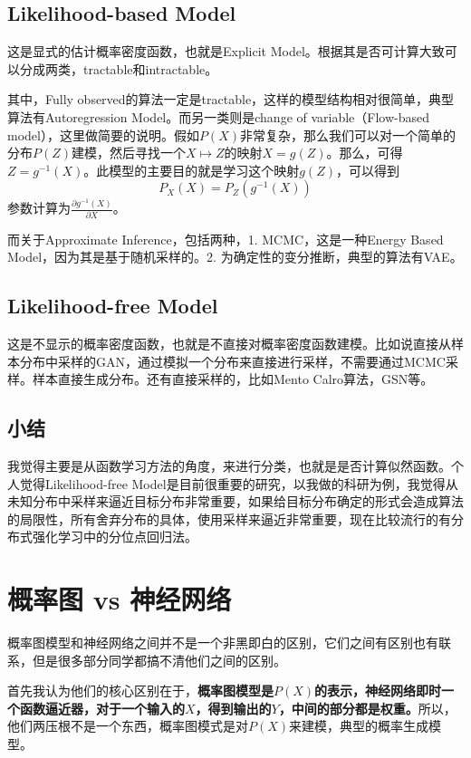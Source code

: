 \documentclass[a4paper]{article}
\begin{document}
\subsection{Likelihood-based Model}
这是显式的估计概率密度函数，也就是Explicit Model。根据其是否可计算大致可以分成两类，tractable和intractable。

其中，Fully observed的算法一定是tractable，这样的模型结构相对很简单，典型算法有Autoregression Model。而另一类则是change of variable（Flow-based model），这里做简要的说明。假如$P(X)$非常复杂，那么我们可以对一个简单的分布$P(Z)$建模，然后寻找一个$X \mapsto Z$的映射$X=g(Z)$。那么，可得$Z = g^{-1}(X)$。此模型的主要目的就是学习这个映射$g(Z)$，可以得到
\begin{equation}
    P_X(X) = P_Z(g^{-1}(X))
\end{equation}
参数计算为$\frac{\partial g^{-1}(X)}{\partial X}$。

而关于Approximate Inference，包括两种，1. MCMC，这是一种Energy Based Model，因为其是基于随机采样的。2. 为确定性的变分推断，典型的算法有VAE。

\subsection{Likelihood-free Model}
这是不显示的概率密度函数，也就是不直接对概率密度函数建模。比如说直接从样本分布中采样的GAN，通过模拟一个分布来直接进行采样，不需要通过MCMC采样。样本直接生成分布。还有直接采样的，比如Mento Calro算法，GSN等。

\subsection{小结}
我觉得主要是从函数学习方法的角度，来进行分类，也就是是否计算似然函数。个人觉得Likelihood-free Model是目前很重要的研究，以我做的科研为例，我觉得从未知分布中采样来逼近目标分布非常重要，如果给目标分布确定的形式会造成算法的局限性，所有舍弃分布的具体，使用采样来逼近非常重要，现在比较流行的有分布式强化学习中的分位点回归法。

\section{概率图 vs 神经网络}
概率图模型和神经网络之间并不是一个非黑即白的区别，它们之间有区别也有联系，但是很多部分同学都搞不清他们之间的区别。

首先我认为他们的核心区别在于，\textbf{概率图模型是$P(X)$的表示，神经网络即时一个函数逼近器，对于一个输入的$X$，得到输出的$Y$，中间的部分都是权重。}所以，他们两压根不是一个东西，概率图模式是对$P(X)$来建模，典型的概率生成模型。
\end{document}
